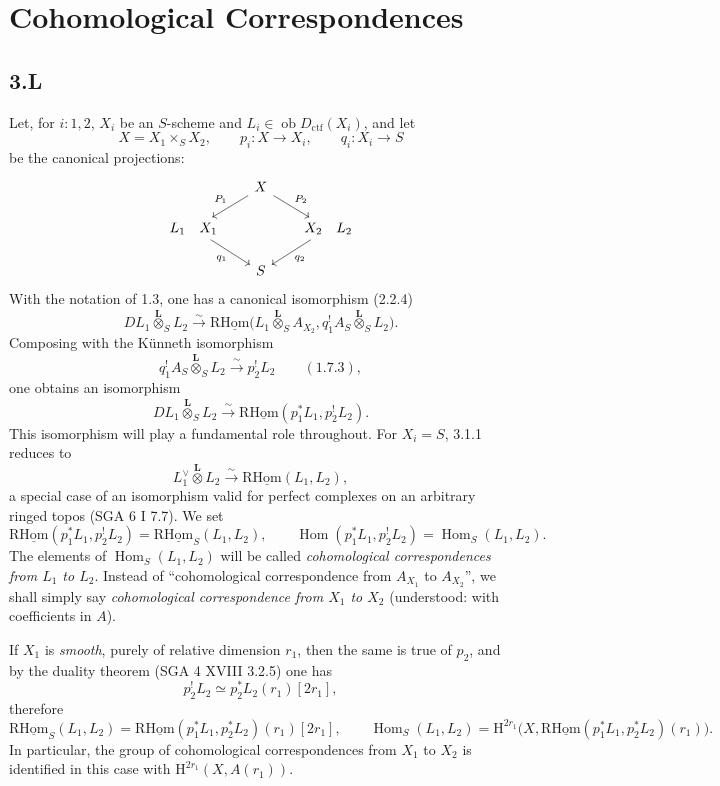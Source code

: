 \documentclass[11pt]{article}
\renewcommand{\H}{\mathrm{H}}
\DeclareMathOperator{\Hom}{Hom}
\newcommand{\ob}{\operatorname{ob}}
\providecommand{\Dctf}{D_{\mathrm{ctf}}}
\providecommand{\Dctf}{D_{\mathrm{ctf}}}
\providecommand{\Hom}{\operatorname{Hom}}
\providecommand{\ob}{\operatorname{ob}}
\providecommand{\Hom}{\operatorname{Hom}}
\begin{document}
\clearpage
\section{Cohomological Correspondences}

\subsection*{3.L}
Let, for $i:1,2$, $X_i$ be an $S$-scheme and $L_i\in\ob\Dctf(X_i)$, and let
\[
X=X_1\times_S X_2,
\qquad
p_i:X\longrightarrow X_i,
\qquad
q_i:X_i\longrightarrow S
\]
be the canonical projections:
\[
\begin{tikzcd}[column sep=1.8em,row sep=1.5em]
& X \arrow[dl,"P_1"'] \arrow[dr,"P_2"] & \\
L_1\quad X_1 \arrow[dr,"q_1"'] & & X_2\quad L_2 \arrow[dl,"q_2"] \\
& S &
\end{tikzcd}
\]
With the notation of 1.3, one has a canonical isomorphism (2.2.4)
\[
DL_1\overset{\mathbf L}{\otimes}_S L_2
\xrightarrow{\sim}
\mathrm{R}\underline{\mathrm{Hom}}\bigl(L_1\overset{\mathbf L}{\otimes}_S A_{X_2},
q_1^!A_S\overset{\mathbf L}{\otimes}_S L_2\bigr).
\]
Composing with the Künneth isomorphism
\[
q_1^!A_S\overset{\mathbf L}{\otimes}_S L_2
\xrightarrow{\sim}p_2^!L_2 \qquad (1.7.3),
\]
one obtains an isomorphism
\begin{equation}
DL_1\overset{\mathbf L}{\otimes}_S L_2
\xrightarrow{\sim}
\mathrm{R}\underline{\mathrm{Hom}}(p_1^*L_1,p_2^!L_2).
\tag{3.1.1}
\end{equation}
This isomorphism will play a fundamental role throughout. For $X_i=S$, 3.1.1 reduces to
\[
L_1^\vee\overset{\mathbf L}{\otimes}L_2\xrightarrow{\sim}\mathrm{R}\underline{\mathrm{Hom}}(L_1,L_2),
\]
a special case of an isomorphism valid for perfect complexes on an arbitrary ringed topos (SGA 6 I 7.7). We set
\begin{equation}
\mathrm{R}\underline{\mathrm{Hom}}(p_1^*L_1,p_2^!L_2)=\mathrm{R}\underline{\mathrm{Hom}}_S(L_1,L_2),
\qquad
\Hom(p_1^*L_1,p_2^!L_2)=\Hom_S(L_1,L_2).
\tag{3.1.2}
\end{equation}
The elements of $\Hom_S(L_1,L_2)$ will be called \emph{cohomological correspondences from $L_1$ to $L_2$}. Instead of ``cohomological correspondence from $A_{X_1}$ to $A_{X_2}$'', we shall simply say \emph{cohomological correspondence from $X_1$ to $X_2$} (understood: with coefficients in $A$).

If $X_1$ is \emph{smooth}, purely of relative dimension $r_1$, then the same is true of $p_2$, and by the duality theorem (SGA 4 XVIII 3.2.5) one has
\[
p_2^!L_2\simeq p_2^*L_2(r_1)[2r_1],
\]
therefore
\begin{equation}
\mathrm{R}\underline{\mathrm{Hom}}_S(L_1,L_2)=\mathrm{R}\underline{\mathrm{Hom}}(p_1^*L_1,p_2^*L_2)(r_1)[2r_1],
\qquad
\Hom_S(L_1,L_2)=\H^{2r_1}\bigl(X,\mathrm{R}\underline{\mathrm{Hom}}(p_1^*L_1,p_2^*L_2)(r_1)\bigr).
\tag{3.1.3}
\end{equation}
In particular, the group of cohomological correspondences from $X_1$ to $X_2$ is identified in this case with $\H^{2r_1}(X,A(r_1))$.
\end{document}
